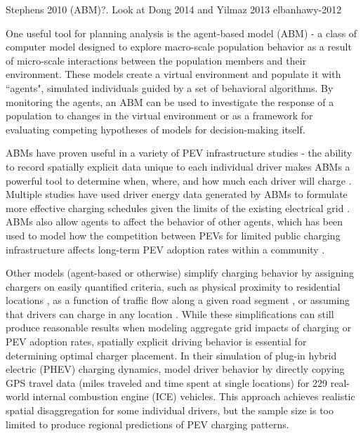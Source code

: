 \documentclass[journal]{IEEEtran}
\begin{document}
Stephens 2010 (ABM)?.
Look at Dong 2014 and Yilmaz 2013
elbanhawy-2012


One useful tool for planning analysis is the agent-based model (ABM) - a class of computer model designed to explore macro-scale population behavior as a result of micro-scale interactions between the population members and their environment. These models create a virtual environment and populate it with ``agents", simulated individuals guided by a set of behavioral algorithms. By monitoring the agents, an ABM can be used to investigate the response of a population to changes in the virtual environment or as a framework for evaluating competing hypotheses of models for decision-making itself.

ABMs have proven useful in a variety of PEV infrastructure studies - the ability to record spatially explicit data unique to each individual driver makes ABMs a powerful tool to determine when, where, and how much each driver will charge \cite{dong_charging_2014}. Multiple studies have used driver energy data generated by ABMs to formulate more effective charging schedules given the limits of the existing electrical grid \cite{waraich_plug-hybrid_2013} \cite{acha_modelling_2012}. ABMs also allow agents to affect the behavior of other agents, which has been used to model how the competition between PEVs for limited public charging infrastructure affects long-term PEV adoption rates within a community \cite{sweda_agent-based_2012}.

Other models (agent-based or otherwise) simplify charging behavior by assigning chargers on easily quantified criteria, such as physical proximity to residential locations \cite{feng_electric_2012}, as a function of traffic flow along a given road segment \cite{dong_framework_2013}, or assuming that drivers can charge in any location \cite{acha_modelling_2012}. While these simplifications can still produce reasonable results when modeling aggregate grid impacts of charging or PEV adoption rates, spatially explicit driving behavior is essential for determining optimal charger placement. In their simulation of plug-in hybrid electric (PHEV) charging dynamics, \cite{dong_within-day_2012} model driver behavior by directly copying GPS travel data (miles traveled and time spent at single locations) for 229 real-world internal combustion engine (ICE) vehicles.  This approach achieves realistic spatial disaggregation for some individual drivers, but the sample size is too limited to produce regional predictions of PEV charging patterns. 
\end{document}
